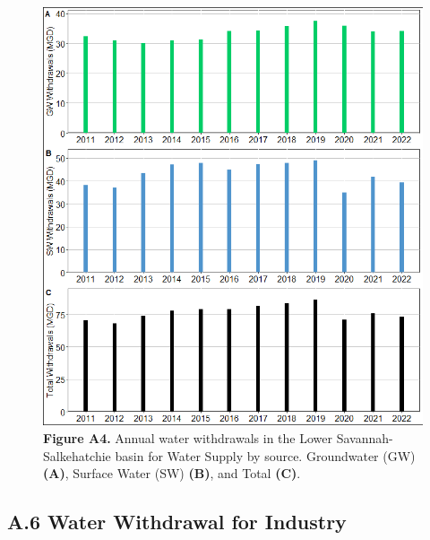 \documentclass[
]{article}
\begin{document}
\begin{figure}[H]

{\centering \includegraphics{LSS_figures/trend-WS_bar-plot-1} 

}

\caption{\textbf{Figure A4.} Annual water withdrawals in the Lower Savannah-Salkehatchie basin for Water Supply by source. Groundwater (GW) \textbf{(A)}, Surface Water (SW) \textbf{(B)}, and Total \textbf {(C)}.}\label{fig:trend-WS_bar-plot}
\end{figure}

\hypertarget{a.6-water-withdrawal-for-industry}{%
\subsection{A.6 Water Withdrawal for
Industry}\label{a.6-water-withdrawal-for-industry}}
\end{document}
